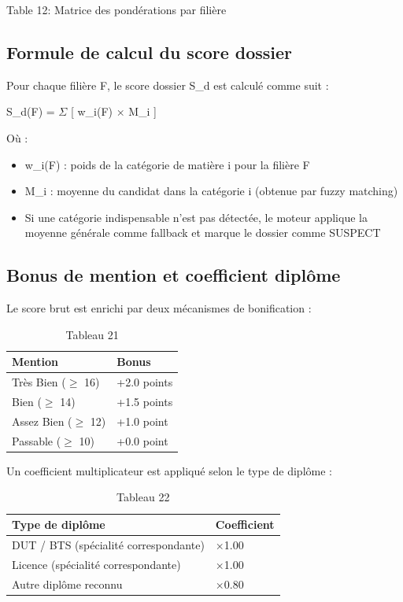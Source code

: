 Table 12: Matrice des pondérations par filière

\subsection{Formule de calcul du score dossier}

Pour chaque filière F, le score dossier S\_d est calculé comme suit :

S\_d(F) = $\Sigma$ [ w\_i(F) × M\_i ]

Où :

\begin{itemize}
\item w\_i(F) : poids de la catégorie de matière i pour la filière F
\item M\_i : moyenne du candidat dans la catégorie i (obtenue par fuzzy matching)
\item Si une catégorie indispensable n'est pas détectée, le moteur applique la moyenne générale comme fallback et marque le dossier comme SUSPECT
\end{itemize}

\subsection{Bonus de mention et coefficient diplôme}

Le score brut est enrichi par deux mécanismes de bonification :

\begin{table}[htbp]
\centering
\begin{tabular}{|l|l|}
\hline
Mention & Bonus \\
\hline
Très Bien ($\geq$ 16) & +2.0 points \\
\hline
Bien ($\geq$ 14) & +1.5 points \\
\hline
Assez Bien ($\geq$ 12) & +1.0 point \\
\hline
Passable ($\geq$ 10) & +0.0 point \\
\hline
\end{tabular}
\caption{Tableau 21}
\label{tab:table_21}
\end{table}

Un coefficient multiplicateur est appliqué selon le type de diplôme :

\begin{table}[htbp]
\centering
\begin{tabular}{|l|l|}
\hline
Type de diplôme & Coefficient \\
\hline
DUT / BTS (spécialité correspondante) & ×1.00 \\
\hline
Licence (spécialité correspondante) & ×1.00 \\
\hline
Autre diplôme reconnu & ×0.80 \\
\hline
\end{tabular}
\caption{Tableau 22}
\label{tab:table_22}
\end{table}

